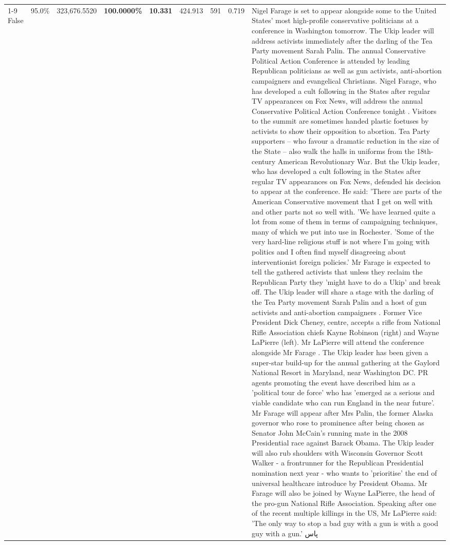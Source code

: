 \begin{table}[H]
\begin{tabular}{lllrlllll}
\cline{1-9}
False & 95.0\% & 323,676.5520 & \bfseries \color{red} 100.0000\% & \bfseries \color{red} 10.331 & 424.913 & 591 & 0.719 & Nigel Farage is set to appear alongside some to the United States' most high-profile conservative politicians at a conference in Washington tomorrow. The Ukip leader will address activists immediately after the darling of the Tea Party movement Sarah Palin. The annual Conservative Political Action Conference is attended by leading Republican politicians as well as gun activists, anti-abortion campaigners and evangelical Christians. Nigel Farage, who has developed a cult following in the States after regular TV appearances on Fox News, will address the annual Conservative Political Action Conference tonight . Visitors to the summit are sometimes handed plastic foetuses by activists to show their opposition to abortion. Tea Party supporters – who favour a dramatic reduction in the size of the State – also walk the halls in uniforms from the 18th-century American Revolutionary War. But the Ukip leader, who has developed a cult following in the States after regular TV appearances on Fox News, defended his decision to appear at the conference. He said: 'There are parts of the American Conservative movement that I get on well with and other parts not so well with. 'We have learned quite a lot from some of them in terms of campaigning techniques, many of which we put into use in Rochester. 'Some of the very hard-line religious stuff is not where I'm going with politics and I often find myself disagreeing about interventionist foreign policies.' Mr Farage is expected to tell the gathered activists that unless they reclaim the Republican Party they 'might have to do a Ukip' and break off. The Ukip leader will share a stage with the darling of the Tea Party movement Sarah Palin and a host of gun activists and anti-abortion campaigners . Former Vice President Dick Cheney, centre, accepts a rifle from National Rifle Association chiefs Kayne Robinson (right) and Wayne LaPierre (left). Mr LaPierre will attend the conference alongside Mr Farage . The Ukip leader has been given a super-star build-up for the annual gathering at the Gaylord National Resort in Maryland, near Washington DC. PR agents promoting the event have described him as a 'political tour de force' who has 'emerged as a serious and viable candidate who can run England in the near future'. Mr Farage will appear after Mrs Palin, the former Alaska governor who rose to prominence after being chosen as Senator John McCain's running mate in the 2008 Presidential race against Barack Obama. The Ukip leader will also rub shoulders with Wisconsin Governor Scott Walker - a frontrunner for the Republican Presidential nomination next year - who wants to 'prioritise' the end of universal healthcare introduce by President Obama. Mr Farage will also be joined by Wayne LaPierre, the head of the pro-gun National Rifle Association. Speaking after one of the recent multiple killings in the US, Mr LaPierre said: 'The only way to stop a bad guy with a gun is with a good guy with a gun.' پاس \\

\end{tabular}
\end{table}
